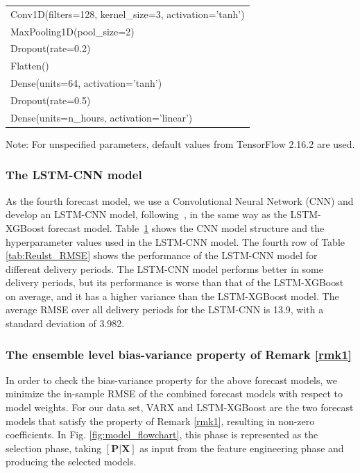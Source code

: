 \documentclass{article}
\begin{document}
\begin{table}[H]
\begin{minipage}[t]{0.48\textwidth}
\begin{tabular}{@{}p{5cm}@{}}
        Conv1D(filters=128, kernel\_size=3, activation='tanh') \\
        MaxPooling1D(pool\_size=2) \\
        Dropout(rate=0.2) \\
        Flatten() \\
        Dense(units=64, activation='tanh') \\
        Dropout(rate=0.5) \\
        Dense(units=n\_hours, activation='linear') \\ \bottomrule
    \end{tabular}
    \vspace{0cm}
    \footnotesize Note: For unspecified parameters, default values from TensorFlow 2.16.2 are used.
    \label{tab:CNN_Model}
\end{minipage}
\end{table}

\subsubsection{The LSTM-CNN model} \label{subsub3}
As the fourth forecast model, we use a Convolutional Neural Network (CNN) and develop an LSTM-CNN model, following~\cite{lehna2022forecasting}, in the same way as the LSTM-XGBoost forecast model. Table~\ref{tab:CNN_Model} shows the CNN model structure and the hyperparameter values used in the LSTM-CNN model. The fourth row of Table \ref{tab:Reulst_RMSE} shows the performance of the LSTM-CNN model for different delivery periods. The LSTM-CNN model performs better in some delivery periods, but its performance is worse than that of the LSTM-XGBoost on average, and it has a higher variance than the LSTM-XGBoost model. The average RMSE over all delivery periods for the LSTM-CNN is 13.9, with a standard deviation of 3.982. 

\subsubsection{The ensemble level bias-variance property of Remark \ref{rmk1}}
In order to check the bias-variance property for the above forecast models, we minimize the in-sample RMSE of the combined forecast models with respect to model weights. For our data set, VARX and LSTM-XGBoost are the two forecast models that satisfy the property of Remark \ref{rmk1}, resulting in non-zero coefficients. In Fig. \ref{fig:model_flowchart}, this phase is represented as the selection phase, taking $[\mathbf{P}|\mathbf{X}]$ as input from the feature engineering phase and producing the selected models. 
\end{document}
